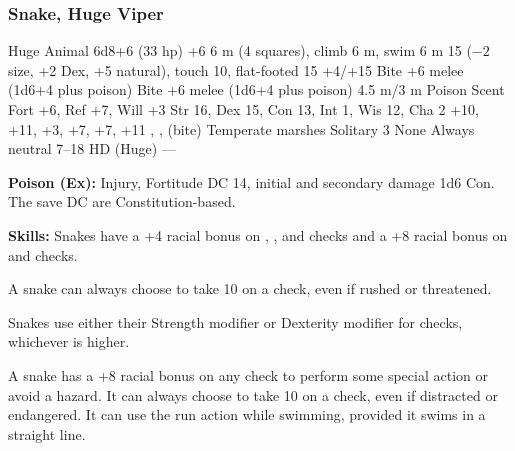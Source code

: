 \subsubsection{Snake, Huge Viper}
\begin{MonsterStats}
{Huge Animal}
{6d8+6 (33 hp)}
{+6}
{6 m (4 squares), climb 6 m, swim 6 m}
{15 ($-2$ size, +2 Dex, +5 natural), touch 10, flat-footed 15}
{+4/+15}
{Bite +6 melee (1d6+4 plus poison)}
{Bite +6 melee (1d6+4 plus poison)}
{4.5 m/3 m}
{Poison}
{Scent}
{Fort +6, Ref +7, Will +3}
{Str 16, Dex 15, Con 13, Int 1, Wis 12, Cha 2}
{ +10,  +11,  +3,  +7,  +7,  +11}
{, ,  (bite)}
{Temperate marshes}
{Solitary}
{3}
{None}
{Always neutral}
{7--18 HD (Huge)}
{---}
\end{MonsterStats}

\textbf{Poison (Ex):} Injury, Fortitude DC 14, initial and secondary damage 1d6 Con. The save DC are Constitution-based.

\textbf{Skills:} Snakes have a +4 racial bonus on , , and  checks and a +8 racial bonus on  and  checks.

A snake can always choose to take 10 on a  check, even if rushed or threatened.

Snakes use either their Strength modifier or Dexterity modifier for  checks, whichever is higher.

A snake has a +8 racial bonus on any  check to perform some special action or avoid a hazard. It can always choose to take 10 on a  check, even if distracted or endangered. It can use the run action while swimming, provided it swims in a straight line.
